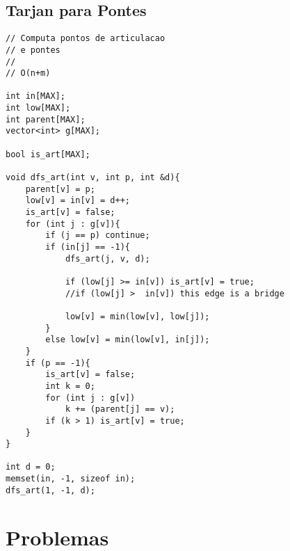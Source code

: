 \documentclass[12pt, a4paper, twoside]{article}
\begin{document}
\subsection{Tarjan para Pontes}
\begin{lstlisting}
// Computa pontos de articulacao
// e pontes
//
// O(n+m)

int in[MAX];
int low[MAX];
int parent[MAX];
vector<int> g[MAX];

bool is_art[MAX];

void dfs_art(int v, int p, int &d){
	parent[v] = p;
	low[v] = in[v] = d++;
	is_art[v] = false;
	for (int j : g[v]){
		if (j == p) continue;
		if (in[j] == -1){
			dfs_art(j, v, d);

			if (low[j] >= in[v]) is_art[v] = true;
			//if (low[j] >  in[v]) this edge is a bridge

			low[v] = min(low[v], low[j]);
		}
		else low[v] = min(low[v], in[j]);
	}
	if (p == -1){
		is_art[v] = false;
		int k = 0;
		for (int j : g[v])
			k += (parent[j] == v);
		if (k > 1) is_art[v] = true;
	}
}

int d = 0;
memset(in, -1, sizeof in);
dfs_art(1, -1, d);
\end{lstlisting}



%
%

\section{Problemas}
\end{document}
